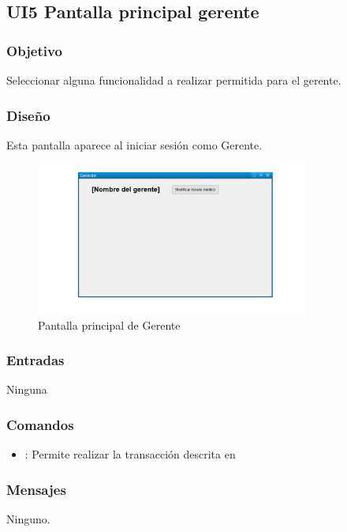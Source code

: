 \subsection{UI5 Pantalla principal gerente}

\subsubsection{Objetivo}
    Seleccionar alguna funcionalidad a realizar permitida para el gerente.

\subsubsection{Diseño}
    Esta pantalla aparece al iniciar sesión como Gerente.

\begin{figure}[htbp!]
        \centering
            \includegraphics[width=0.8\textwidth]{images/UIGerente1}
        \caption{Pantalla principal de Gerente}
    \end{figure}


\subsubsection{Entradas}
  Ninguna

\subsubsection{Comandos}
\begin{itemize}
    \item {}: Permite realizar la transacción descrita en 
\end{itemize}

\subsubsection{Mensajes}
   Ninguno.
   
